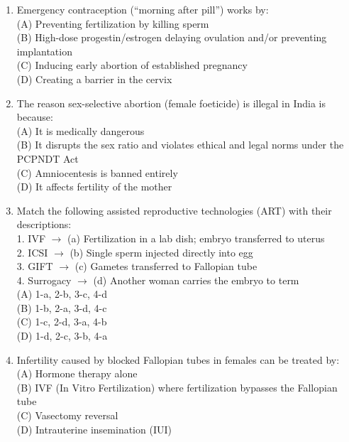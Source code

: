 \documentclass{article}
\begin{document}
\begin{enumerate}[label=Q\arabic*.]
\item Emergency contraception (``morning after pill'') works by:
\\(A) Preventing fertilization by killing sperm
\\(B) High-dose progestin/estrogen delaying ovulation and/or preventing implantation
\\(C) Inducing early abortion of established pregnancy
\\(D) Creating a barrier in the cervix

\item The reason sex-selective abortion (female foeticide) is illegal in India is because:
\\(A) It is medically dangerous
\\(B) It disrupts the sex ratio and violates ethical and legal norms under the PCPNDT Act
\\(C) Amniocentesis is banned entirely
\\(D) It affects fertility of the mother

\item Match the following assisted reproductive technologies (ART) with their descriptions:\\
1. IVF $\rightarrow$ (a) Fertilization in a lab dish; embryo transferred to uterus\\
2. ICSI $\rightarrow$ (b) Single sperm injected directly into egg\\
3. GIFT $\rightarrow$ (c) Gametes transferred to Fallopian tube\\
4. Surrogacy $\rightarrow$ (d) Another woman carries the embryo to term
\\(A) 1-a, 2-b, 3-c, 4-d
\\(B) 1-b, 2-a, 3-d, 4-c
\\(C) 1-c, 2-d, 3-a, 4-b
\\(D) 1-d, 2-c, 3-b, 4-a

\item Infertility caused by blocked Fallopian tubes in females can be treated by:
\\(A) Hormone therapy alone
\\(B) IVF (In Vitro Fertilization) where fertilization bypasses the Fallopian tube
\\(C) Vasectomy reversal
\\(D) Intrauterine insemination (IUI)

\end{enumerate}
\end{document}
